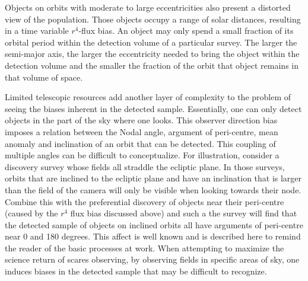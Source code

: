\documentclass{aastex62}
\begin{document}
Objects on orbits with moderate to large eccentricities also present a distorted view of the population.  Those objects occupy a range of solar distances, resulting in a time variable $r^4$-flux bias. An object may only spend a small fraction of its orbital period within the detection volume of a particular survey. The larger the semi-major axis, the larger the eccentricity needed to bring the object within the detection volume and the smaller the fraction of the orbit that object remains in that volume of space.

Limited telescopic resources add another layer of complexity to the problem of seeing the biases inherent in the detected sample.  Essentially, one can only detect objects in the part of the sky where one looks.  This observer direction bias imposes a relation between the Nodal angle, argument of peri-centre, mean anomaly and inclination of an orbit that can be detected.  This coupling of multiple angles can be difficult to conceptualize.  For illustration, consider a discovery survey whose fields all straddle the ecliptic plane.  In those surveys,  orbits that are inclined to the ecliptic plane and have an inclination that is larger than the field of the camera will only be visible when looking towards their node. Combine this with the preferential discovery of objects near their peri-centre (caused by the $r^4$ flux bias discussed above) and such a the survey will find that the detected sample of objects on inclined orbits all have arguments of peri-centre near 0 and 180 degrees. This affect is well known and is described here to remind the reader of the basic processes at work.  When attempting to maximize the science return of scares observing, by observing fields in specific areas of sky, one induces biases in the detected sample that may be difficult to recognize. 
\end{document}
